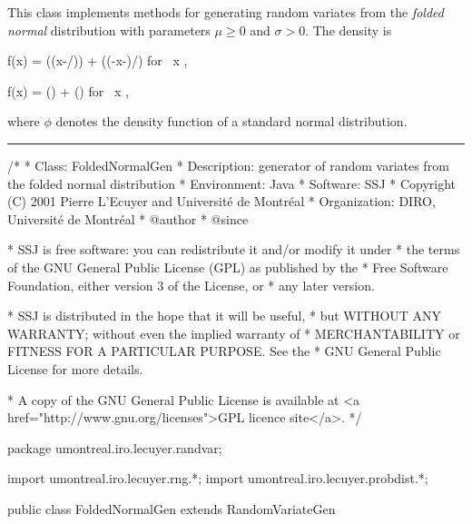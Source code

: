 
This class implements methods for generating random variates from the 
{\em folded normal\/} distribution  with
parameters $\mu \ge 0$  and $\sigma > 0$.
The density is
\begin{htmlonly}
\eq
  f(x) = \phi \left((x-\mu/)\sigma\right) + \phi \left((-x-\mu)/\sigma\right) 
   \qquad \mbox {for  } x ,
\endeq
\end{htmlonly}
\begin{latexonly} 
\eq
 f(x) = \phi \left(\right) + 
        \phi \left(\right) 
   \qquad \mbox {for  } x ,   
\endeq
\end{latexonly}
where $ \phi $ denotes the density function of a standard normal distribution.

\bigskip\hrule

\begin{code}
\begin{hide}
/*
 * Class:        FoldedNormalGen
 * Description:  generator of random variates from the folded normal distribution
 * Environment:  Java
 * Software:     SSJ 
 * Copyright (C) 2001  Pierre L'Ecuyer and Université de Montréal
 * Organization: DIRO, Université de Montréal
 * @author       
 * @since

 * SSJ is free software: you can redistribute it and/or modify it under
 * the terms of the GNU General Public License (GPL) as published by the
 * Free Software Foundation, either version 3 of the License, or
 * any later version.

 * SSJ is distributed in the hope that it will be useful,
 * but WITHOUT ANY WARRANTY; without even the implied warranty of
 * MERCHANTABILITY or FITNESS FOR A PARTICULAR PURPOSE.  See the
 * GNU General Public License for more details.

 * A copy of the GNU General Public License is available at
   <a href="http://www.gnu.org/licenses">GPL licence site</a>.
 */
\end{hide}
package umontreal.iro.lecuyer.randvar;\begin{hide}
import umontreal.iro.lecuyer.rng.*;
import umontreal.iro.lecuyer.probdist.*;
\end{hide}

public class FoldedNormalGen extends RandomVariateGen \begin{hide} {
    
   // Distribution parameters
   protected double mu;
   protected double sigma;
\end{hide}
\end{code}

